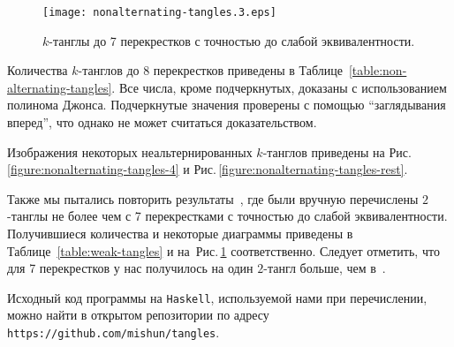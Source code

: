 \documentclass[12pt]{article}
\theoremstyle{plain}
\theoremstyle{definition}
\def\figureref#1{Рис.\,\protect\ref{#1}}
\begin{document}
		\begin{figure}[ht]
			\centering
			\texttt{[image: nonalternating-tangles.3.eps]}
			\caption{\footnotesize $k$-танглы до 7 перекрестков с точностью до слабой эквивалентности.\label{figure:weak-tangles-7}}
		\end{figure}

		Количества $k$-танглов до 8 перекрестков приведены в Таблице~\ref{table:non-alternating-tangles}. Все числа, кроме подчеркнутых,
		доказаны с использованием полинома Джонса. Подчеркнутые значения проверены с помощью ``заглядывания вперед'', что однако не
		может считаться доказательством.

		Изображения некоторых неальтернированных $k$-танглов приведены на \figureref{figure:nonalternating-tangles-4} и
		\figureref{figure:nonalternating-tangles-rest}.

		Также мы пытались повторить результаты~\cite{KanenobuSaitoSatoh2003}, где были вручную перечислены $2$-танглы не более чем
		с 7 перекрестками с точностью до слабой эквивалентности. Получившиеся количества и некоторые диаграммы приведены в
		Таблице~\ref{table:weak-tangles} и на~\figureref{figure:weak-tangles-7} соответственно. Следует отметить, что для 7
		перекрестков у нас получилось на один $2$-тангл больше, чем в~\cite{KanenobuSaitoSatoh2003}.

		Исходный код программы на \texttt{Haskell}, используемой нами при перечислении, можно найти в открытом репозитории по
		адресу \texttt{https://github.com/mishun/tangles}.
\end{document}
